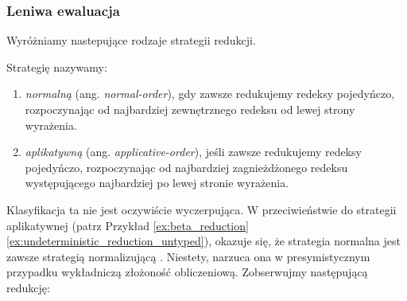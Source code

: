 \subsubsection{Leniwa ewaluacja}\label{subsec:lazy_eval}
Wyróżniamy nastepujące rodzaje strategii redukcji.

\begin{definicja}
Strategię nazywamy:
\begin{enumerate}
\item \emph{normalną} (ang. \emph{normal-order}), gdy zawsze redukujemy redeksy pojedyńczo, rozpoczynając od najbardziej zewnętrznego redeksu od lewej strony wyrażenia.
\item \emph{aplikatywną} (ang. \emph{applicative-order}), jeśli zawsze redukujemy redeksy pojedyńczo, rozpoczynając od najbardziej zagnieżdżonego redeksu występującego najbardziej po lewej stronie wyrażenia.
\end{enumerate}
\end{definicja}

Klasyfikacja ta nie jest oczywiście wyczerpująca. W przeciwieństwie do strategii aplikatywnej (patrz Przykład \ref{ex:beta_reduction}\ref{ex:undeterministic_reduction_untyped}), okazuje się, że strategia normalna jest zawsze strategią normalizującą \cite[Rozdział 1.5]{Urzyczyn2006}. Niestety, narzuca ona w presymistycznym przypadku wykładniczą złożoność obliczeniową. Zobserwujmy następującą redukcję:


